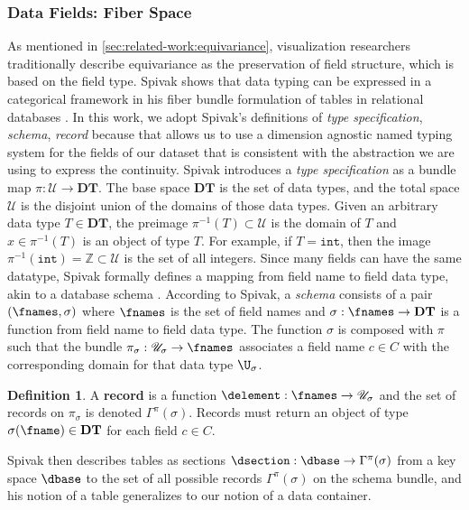 \documentclass[10pt,journal,compsoc]{IEEEtran}
\theoremstyle{definition}
\newtheorem{definition}{Definition}[section]
\theoremstyle{remark}
\begin{document}
\subsubsection{Data Fields: Fiber Space \dfiber}
\label{sec:atct:fb:fiber}
As mentioned in \autoref{sec:related-work:equivariance}, visualization researchers traditionally describe equivariance as the preservation of field structure, which is based on the field type. Spivak shows that data typing can be expressed in a categorical framework in his fiber bundle formulation of tables in relational databases \cite{spivakDatabasesAreCategories2010,spivakSimplicialDatabases2009}. In this work, we adopt Spivak's definitions of \textit{type specification}, \textit{schema}, \textit{record} because that allows us to use a dimension agnostic named typing system for the fields of our dataset that is consistent with the abstraction we are using to express the continuity. Spivak introduces a \textit{type specification} as a bundle map $\pi: \mathscr{U} \rightarrow \textbf{DT}$. The base space $\textbf{DT}$ is the set of data types, and the total space $\mathscr{U}$ is the disjoint union of the domains of those data types. Given an arbitrary data type $T \in \textbf{DT}$, the preimage $ \pi^{-1}(T) \subset \mathscr{U}$ is the domain of $T$ and $x \in \pi^{-1}(T)$ is an object of type $T$\cite{spivakSimplicialDatabases2009}. For example, if $T=\texttt{int}$, then the image $\pi^{-1}(\texttt{int}) = \mathbb{Z} \subset \mathscr{U}$ is the set of all integers. Since many fields can have the same datatype, Spivak formally defines a mapping from field name to field data type, akin to a database schema \cite{ullmanFirstCourseDatabase2008}. According to Spivak, a \textit{schema} consists of a pair $(\fnames, \sigma)$ where $\fnames$ is the set of field names and $\sigma: \fnames \rightarrow \textbf{DT}$ is a function from field name to field data type\cite{spivakSIMPLICIALDATABASESa}. The function $\sigma$ is composed with $\pi$ such that the bundle  $\pi_{\sigma}:\mathscr{U}_{\sigma} \rightarrow \fnames$ associates a field name $c \in C$ with the corresponding domain for that data type $\mathscr{\U}_{\sigma}$. 
\begin{definition} A \textbf{record} is a function $\delement: \fnames \rightarrow \mathscr{U}_{\sigma}$ and the set of records on $\pi_{\sigma}$ is denoted $\Gamma^{\pi}(\sigma)$. Records must return an object of type $\sigma(\fname) \in \textbf{DT}$ for each field $c \in C$.
\end{definition}
Spivak then describes tables as sections $\dsection: \dbase \rightarrow \Gamma^{\pi}(\sigma)$ from a key space $\dbase$ to the set of all possible records $\Gamma^{\pi}(\sigma)$ on the schema bundle, and his notion of a table generalizes to our notion of a data container. 
\end{document}
